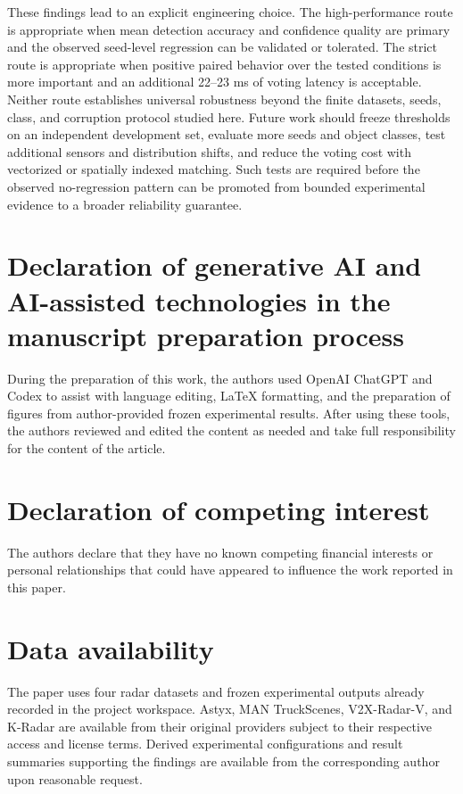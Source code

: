 \documentclass[preprint,12pt,times]{elsarticle}
\begin{document}
These findings lead to an explicit engineering choice. The high-performance
route is appropriate when mean detection accuracy and confidence quality are
primary and the observed seed-level regression can be validated or tolerated.
The strict route is appropriate when positive paired behavior over the tested
conditions is more important and an additional 22--23 ms of voting latency is
acceptable. Neither route establishes universal robustness beyond the finite
datasets, seeds, class, and corruption protocol studied here. Future work
should freeze thresholds on an independent development set, evaluate more
seeds and object classes, test additional sensors and distribution shifts, and
reduce the voting cost with vectorized or spatially indexed matching. Such
tests are required before the observed no-regression pattern can be promoted
from bounded experimental evidence to a broader reliability guarantee.

\section*{Declaration of generative AI and AI-assisted technologies in the
manuscript preparation process}

During the preparation of this work, the authors used OpenAI ChatGPT and Codex
to assist with language editing, LaTeX formatting, and the preparation of
figures from author-provided frozen experimental results. After using these
tools, the authors reviewed and edited the content as needed and take full
responsibility for the content of the article.

\section*{Declaration of competing interest}

The authors declare that they have no known competing financial interests or
personal relationships that could have appeared to influence the work reported
in this paper.

\section*{Data availability}

The paper uses four radar datasets and frozen experimental outputs already
recorded in the project workspace. Astyx, MAN TruckScenes, V2X-Radar-V, and
K-Radar are available from their original providers subject to their
respective access and license terms. Derived experimental configurations and
result summaries supporting the findings are available from the corresponding
author upon reasonable request.


\end{document}
